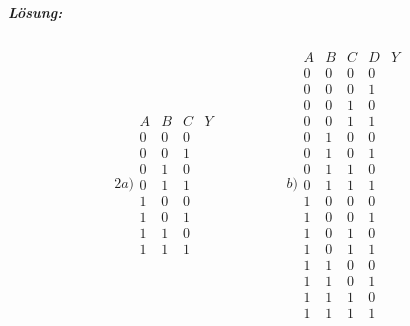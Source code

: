 \documentclass[12pt,a4paper,ngerman]{scrartcl}
\begin{document}
	\subparagraph{Lösung:}
	\begin{alignat*}{2}
		a) \begin{array}{ccc|c}
			A & B  & C & Y\\
			\hline
			0 & 0 & 0 & \mbox{ }\\
			0 & 0 & 1 & \mbox{ }\\
			0 & 1 & 0 & \mbox{ }\\
			0 & 1 & 1 & \mbox{ }\\
			1 & 0 & 0 & \mbox{ }\\
			1 & 0 & 1 & \mbox{ }\\
			1 & 1 & 0 & \mbox{ }\\
			1 & 1 & 1 & \mbox{ }
		\end{array}
		\qquad & \qquad
		b) \begin{array}{cccc|c}
			A & B  & C  & D & Y\\
			\hline
			0 & 0 & 0 & 0 & \mbox{ }\\
			0 & 0 & 0 & 1 & \mbox{ }\\
			0 & 0 & 1 & 0 & \mbox{ }\\
			0 & 0 & 1 & 1 & \mbox{ }\\
			0 & 1 & 0 & 0 & \mbox{ }\\
			0 & 1 & 0 & 1 & \mbox{ }\\
			0 & 1 & 1 & 0 & \mbox{ }\\
			0 & 1 & 1 & 1 & \mbox{ }\\
			1 & 0 & 0 & 0 & \mbox{ }\\
			1 & 0 & 0 & 1 & \mbox{ }\\
			1 & 0 & 1 & 0 & \mbox{ }\\
			1 & 0 & 1 & 1 & \mbox{ }\\
			1 & 1 & 0 & 0 & \mbox{ }\\
			1 & 1 & 0 & 1 & \mbox{ }\\
			1 & 1 & 1 & 0 & \mbox{ }\\
			1 & 1 & 1 & 1 & \mbox{ }
		\end{array}
	\end{alignat*}
	
\end{document}
